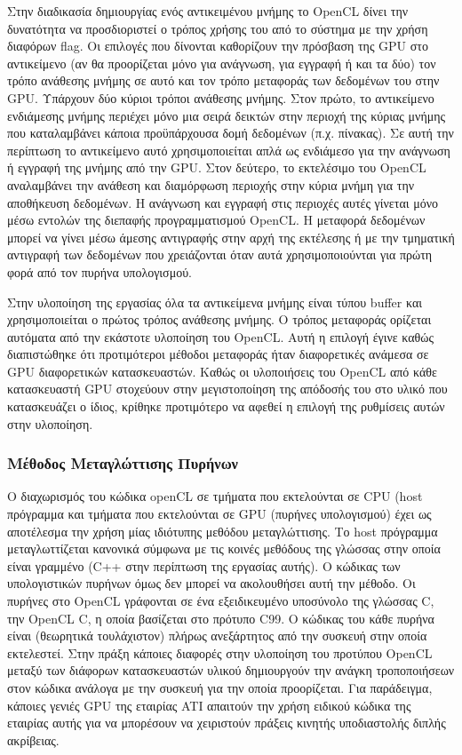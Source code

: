 Στην διαδικασία δημιουργίας ενός αντικειμένου μνήμης το OpenCL δίνει την δυνατότητα να προσδιοριστεί ο τρόπος χρήσης του από το σύστημα με την χρήση διαφόρων flag. Οι επιλογές που δίνονται καθορίζουν την πρόσβαση της GPU στο αντικείμενο (αν θα προορίζεται μόνο για ανάγνωση, για εγγραφή ή και τα δύο) τον τρόπο ανάθεσης μνήμης σε αυτό και τον τρόπο μεταφοράς των δεδομένων του στην GPU. Υπάρχουν δύο κύριοι τρόποι ανάθεσης μνήμης. Στον πρώτο, το αντικείμενο ενδιάμεσης μνήμης περιέχει μόνο μια σειρά δεικτών στην περιοχή της κύριας μνήμης που καταλαμβάνει κάποια προϋπάρχουσα δομή δεδομένων (π.χ. πίνακας). Σε αυτή την περίπτωση το αντικείμενο αυτό χρησιμοποιείται απλά ως ενδιάμεσο για την ανάγνωση ή εγγραφή της μνήμης από την GPU. Στον δεύτερο, το εκτελέσιμο του OpenCL αναλαμβάνει την ανάθεση και διαμόρφωση περιοχής στην κύρια μνήμη για την αποθήκευση δεδομένων. Η ανάγνωση και εγγραφή στις περιοχές αυτές γίνεται μόνο μέσω εντολών της διεπαφής προγραμματισμού OpenCL. Η μεταφορά δεδομένων μπορεί να γίνει μέσω άμεσης 
αντιγραφής στην αρχή της εκτέλεσης ή με την τμηματική αντιγραφή των δεδομένων που χρειάζονται όταν αυτά χρησιμοποιούνται για πρώτη φορά από τον πυρήνα υπολογισμού.

Στην υλοποίηση της εργασίας όλα τα αντικείμενα μνήμης είναι τύπου buffer και χρησιμοποιείται ο πρώτος τρόπος ανάθεσης μνήμης. Ο τρόπος μεταφοράς ορίζεται αυτόματα από την εκάστοτε υλοποίηση του OpenCL. Αυτή η επιλογή έγινε καθώς διαπιστώθηκε ότι  προτιμότεροι μέθοδοι μεταφοράς ήταν διαφορετικές ανάμεσα σε GPU διαφορετικών κατασκευαστών. Καθώς οι υλοποιήσεις του OpenCL από κάθε κατασκευαστή GPU στοχεύουν στην μεγιστοποίηση της απόδοσής του στο υλικό που κατασκευάζει ο ίδιος, κρίθηκε προτιμότερο να αφεθεί η επιλογή της ρυθμίσεις αυτών στην υλοποίηση.  

\subsubsection*{Μέθοδος Μεταγλώττισης Πυρήνων}

\noindent Ο διαχωρισμός του κώδικα openCL σε τμήματα που εκτελούνται σε CPU (host πρόγραμμα και τμήματα που εκτελούνται σε GPU (πυρήνες υπολογισμού) έχει ως αποτέλεσμα την χρήση μίας ιδιότυπης μεθόδου μεταγλώττισης. Το host πρόγραμμα μεταγλωττίζεται κανονικά σύμφωνα με τις κοινές μεθόδους της γλώσσας στην οποία είναι γραμμένο (C++ στην περίπτωση της εργασίας αυτής). Ο κώδικας των υπολογιστικών πυρήνων όμως δεν μπορεί να ακολουθήσει αυτή την μέθοδο. Οι πυρήνες στο OpenCL γράφονται σε ένα εξειδικευμένο υποσύνολο της γλώσσας C, την OpenCL C, η οποία βασίζεται στο πρότυπο C99. Ο κώδικας του κάθε πυρήνα είναι (θεωρητικά τουλάχιστον) πλήρως ανεξάρτητος από την συσκευή στην οποία εκτελεστεί. Στην πράξη κάποιες διαφορές στην υλοποίηση του προτύπου OpenCL μεταξύ των διάφορων κατασκευαστών υλικού δημιουργούν την ανάγκη τροποποιήσεων στον κώδικα ανάλογα με την συσκευή για την οποία προορίζεται. Για παράδειγμα, κάποιες γενιές GPU της εταιρίας ATI απαιτούν την χρήση ειδικού κώδικα της εταιρίας αυτής για να μπορέσουν να 
χειριστούν πράξεις κινητής υποδιαστολής διπλής ακρίβειας. 

